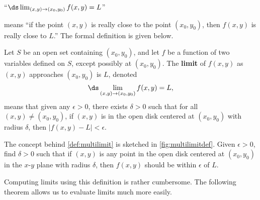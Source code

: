 \begin{center}
``$\ds \lim_{(x,y)\to (x_0,y_0)} f(x,y) = L$''
\end{center}
means ``if the point $(x,y)$ is really close to the point $(x_0,y_0)$, then $f(x,y)$ is really close to $L$.'' The formal definition is given below.

{Let $S$ be an open set containing $(x_0,y_0)$, and let $f$ be a function of two variables defined on $S$, except possibly at $(x_0,y_0)$. 
The \textbf{limit} of $f(x,y)$ as $(x,y)$ approaches $(x_0,y_0)$ is $L$, denoted $$\ds \lim_{(x,y)\to (x_0,y_0)} f(x,y) = L,$$
means that given any $\epsilon>0$, there exists $\delta>0$ such that for all  $(x,y)\neq (x_0,y_0)$, if $(x,y)$ is in the open disk centered at $(x_0,y_0)$ with radius $\delta$, then $|f(x,y) - L|<\epsilon.$
}


The concept behind \autoref{def:multilimit} is sketched in \autoref{fig:multilimitdef}. Given $\epsilon>0$, find $\delta>0$ such that if $(x,y)$ is any point in the open disk centered at $(x_0,y_0)$ in the $x$-$y$ plane with radius $\delta$, then $f(x,y)$ should be within $\epsilon$ of $L$. 

Computing limits using this definition is rather cumbersome. The following theorem allows us to evaluate limits much more easily.

